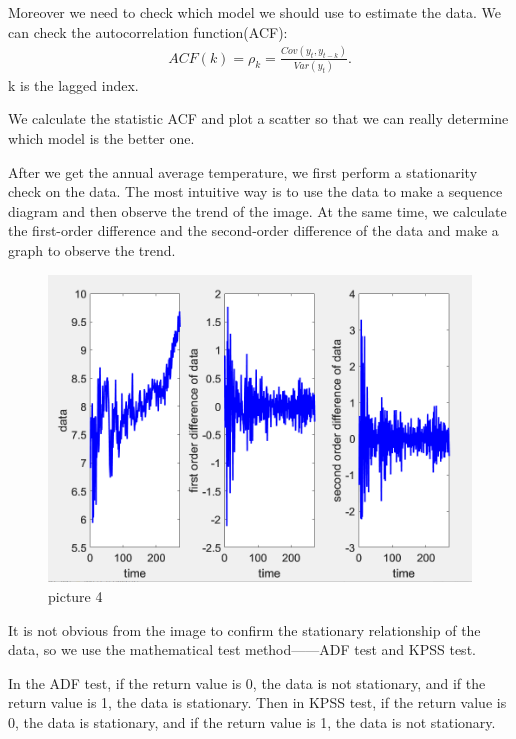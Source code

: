 \documentclass{apmcmthesis}
\begin{document}
Moreover we need to check which model we should use to estimate the data.
We can check the autocorrelation function(ACF):
\begin{align*}
  ACF(k)=\rho_k = \frac{Cov(y_t,y_{t-k})}{Var(y_t)}.
\end{align*}
k is the lagged index.

We calculate the statistic ACF and plot a scatter so that we can really determine which model is the better one.

After we get the annual average temperature, we first perform a stationarity check on the data. The most intuitive way is to use the data to make a sequence diagram and then observe the trend of the image. At the same time, we calculate the first-order difference and the second-order difference of the data and make a graph to observe the trend.

\begin{figure}[htbp]
  \centering
  \includegraphics[scale=0.35]{Smoothness Analysis.png}
  \caption{picture 4}
\end{figure}

It is not obvious from the image to confirm the stationary relationship of the data, so we use the mathematical test method——ADF test and KPSS test.

In the ADF test, if the return value is 0, the data is not stationary, and if the return value is 1, the data is stationary. Then in KPSS test, if the return value is 0, the data is stationary, and if the return value is 1, the data is not stationary.
\end{document}
